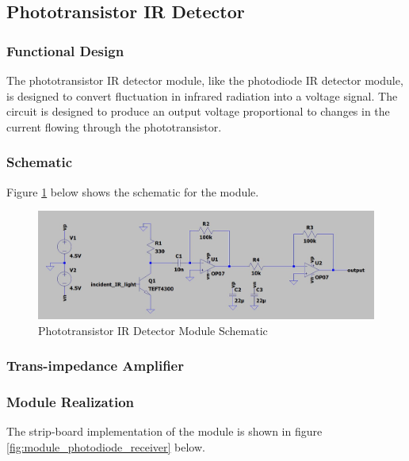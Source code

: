 


\subsection{Phototransistor IR Detector}

\subsubsection{Functional Design}
The phototransistor IR detector module, like the photodiode IR detector module, is designed to convert fluctuation in infrared radiation into a voltage signal. The circuit is designed to produce an output voltage proportional to changes in the current flowing through the phototransistor.

\subsubsection{Schematic}
Figure \ref{fig:schematic_phototransistor_detector} below shows the schematic for the module.


\begin{figure}[H]
	\centering
	\includegraphics[width=.9\textwidth]{figures/design/phototransistor_detector.JPG}
	\caption{Phototransistor IR Detector Module Schematic}
	\label{fig:schematic_phototransistor_detector}
\end{figure}

\subsubsection{Trans-impedance Amplifier}


\subsubsection{Module Realization}
The strip-board implementation of the module is shown in figure \ref{fig:module_photodiode_receiver} below.

